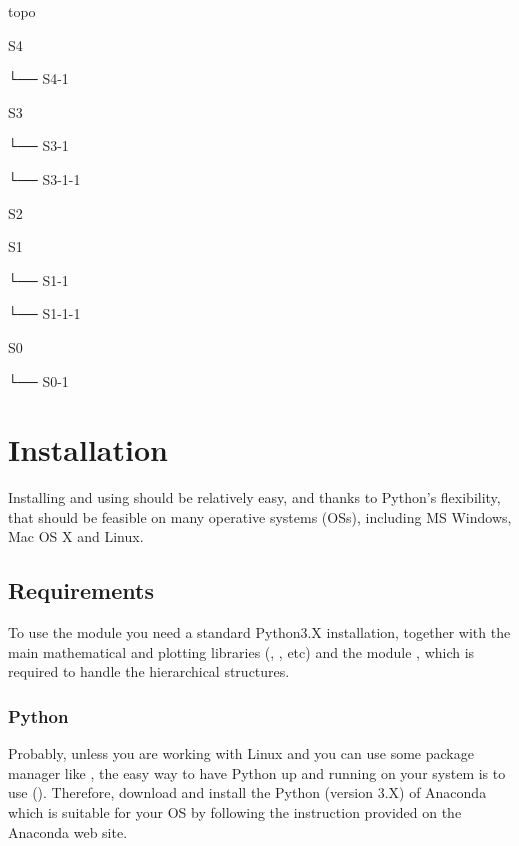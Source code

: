 \documentclass[letterpaper,10pt,english]{sphinxmanual}
\begin{document}
\begin{DUlineblock}{0em}
\item[] topo
\item[] S4
\item[] └── S4-1
\item[] S3
\item[] └── S3-1
\item[]
\begin{DUlineblock}{\DUlineblockindent}
\item[] └── S3-1-1
\end{DUlineblock}
\item[] S2
\item[] S1
\item[] └── S1-1
\item[]
\begin{DUlineblock}{\DUlineblockindent}
\item[] └── S1-1-1
\end{DUlineblock}
\item[] S0
\item[] └── S0-1
\end{DUlineblock}


\chapter{Installation}
\label{\detokenize{install:installation}}\label{\detokenize{install::doc}}
Installing and using  should be relatively easy, and thanks to
Python’s flexibility, that should be feasible on many operative
systems (OSs), including MS Windows, Mac OS X and Linux.


\section{Requirements}
\label{\detokenize{install:requirements}}
To use the  module you need a standard Python3.X installation,
together with the main mathematical and plotting libraries (,
,  etc) and the module , which is
required to handle the hierarchical structures.


\subsection{Python}
\label{\detokenize{install:python}}
Probably, unless you are working with Linux and you can use some
package manager like , the easy way to have Python up and
running on your system is to use 
(). Therefore,
download and install the Python (version 3.X) of Anaconda which is
suitable for your OS by following the instruction provided on the
Anaconda web site.
\end{document}
